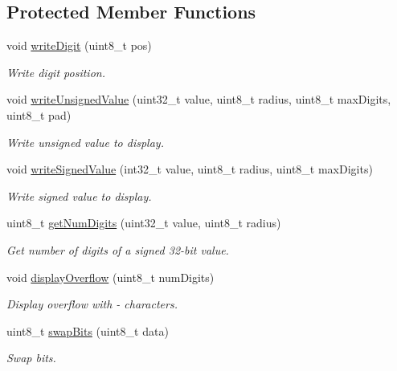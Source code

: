\subsection*{Protected Member Functions}
\begin{DoxyCompactItemize}
\item 
void \hyperlink{class_l_k_m1638_board_a186ecd4a644171428fbd93aa7f309ccb}{write\+Digit} (uint8\+\_\+t pos)
\begin{DoxyCompactList}\small\item\em Write digit position. \end{DoxyCompactList}\item 
void \hyperlink{class_l_k_m1638_board_a54932b39bb7571604299d1c25d334086}{write\+Unsigned\+Value} (uint32\+\_\+t value, uint8\+\_\+t radius, uint8\+\_\+t max\+Digits, uint8\+\_\+t pad)
\begin{DoxyCompactList}\small\item\em Write unsigned value to display. \end{DoxyCompactList}\item 
void \hyperlink{class_l_k_m1638_board_acacc4f02b25f985486f625af9e6edce5}{write\+Signed\+Value} (int32\+\_\+t value, uint8\+\_\+t radius, uint8\+\_\+t max\+Digits)
\begin{DoxyCompactList}\small\item\em Write signed value to display. \end{DoxyCompactList}\item 
uint8\+\_\+t \hyperlink{class_l_k_m1638_board_ad56606fb7bca18eb6a3f16d45a8d294b}{get\+Num\+Digits} (uint32\+\_\+t value, uint8\+\_\+t radius)
\begin{DoxyCompactList}\small\item\em Get number of digits of a signed 32-\/bit value. \end{DoxyCompactList}\item 
void \hyperlink{class_l_k_m1638_board_abaffb270a3b1baa76d15416ff6c0aa30}{display\+Overflow} (uint8\+\_\+t num\+Digits)
\begin{DoxyCompactList}\small\item\em Display overflow with -\/ characters. \end{DoxyCompactList}\item 
uint8\+\_\+t \hyperlink{class_l_k_m1638_board_aef7255786ce884f881b84b6d182fbaad}{swap\+Bits} (uint8\+\_\+t data)
\begin{DoxyCompactList}\small\item\em Swap bits. \end{DoxyCompactList}\item 

\end{DoxyCompactItemize}
